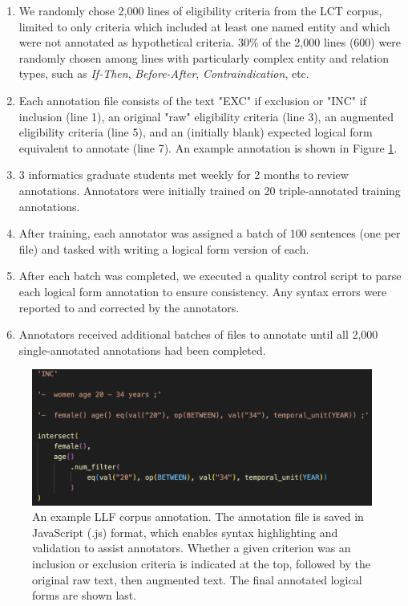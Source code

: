 \documentclass[../main.tex]{subfiles}
\begin{document}
\begin{enumerate}
    \item We randomly chose 2,000 lines of eligibility criteria from the LCT corpus, limited to only criteria which included at least one named entity and which were not annotated as hypothetical criteria. 30\% of the 2,000 lines (600) were randomly chosen among lines with particularly complex entity and relation types, such as \textit{If-Then}, \textit{Before-After}, \textit{Contraindication}, etc.
    \item  Each annotation file consists of the text "EXC" if exclusion or "INC" if inclusion (line 1), an original "raw" eligibility criteria (line 3), an augmented eligibility criteria (line 5), and an (initially blank) expected logical form equivalent to annotate (line 7). An example annotation is shown in Figure \ref{fig_annotation_example}.
    \item 3 informatics graduate students met weekly for 2 months to review annotations. Annotators were initially trained on 20 triple-annotated training annotations. 
    \item After training, each annotator was assigned a batch of 100 sentences (one per file) and tasked with writing a logical form version of each.
    \item After each batch was completed, we executed a quality control script to parse each logical form annotation to ensure consistency. Any syntax errors were reported to and corrected by the annotators.
    \item Annotators received additional batches of files to annotate until all 2,000 single-annotated annotations had been completed.
\end{enumerate}

\begin{figure}[h]
  \centering
  \includegraphics[scale=0.7]{Figures/4_llf_corpus/annotation_example.png}
  \caption{An example LLF corpus annotation. The annotation file is saved in JavaScript (.js) format, which enables syntax highlighting and validation to assist annotators. Whether a given criterion was an inclusion or exclusion criteria is indicated at the top, followed by the original raw text, then augmented text. The final annotated logical forms are shown last.}
  \label{fig_annotation_example}
\end{figure}
\end{document}
